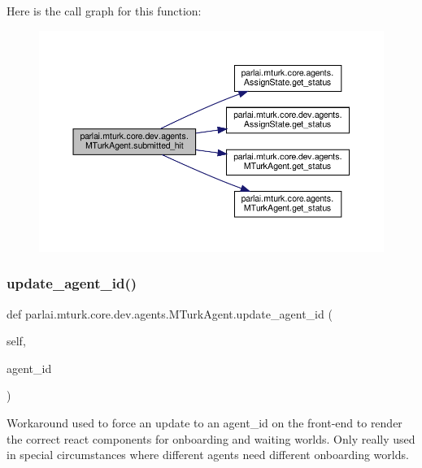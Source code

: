 Here is the call graph for this function\+:
\nopagebreak
\begin{figure}[H]
\begin{center}
\leavevmode
\includegraphics[width=350pt]{classparlai_1_1mturk_1_1core_1_1dev_1_1agents_1_1MTurkAgent_a6662232ebdd301d2547c2433cd0386f3_cgraph}
\end{center}
\end{figure}
\mbox{\label{classparlai_1_1mturk_1_1core_1_1dev_1_1agents_1_1MTurkAgent_a77a8ec97a6c6662dd17cdd9f99d9fce6}} 
\subsubsection{\texorpdfstring{update\+\_\+agent\+\_\+id()}{update\_agent\_id()}}
{\footnotesize\ttfamily def parlai.\+mturk.\+core.\+dev.\+agents.\+M\+Turk\+Agent.\+update\+\_\+agent\+\_\+id (\begin{DoxyParamCaption}\item[{}]{self,  }\item[{}]{agent\+\_\+id }\end{DoxyParamCaption})}

\begin{DoxyVerb}Workaround used to force an update to an agent_id on the front-end
to render the correct react components for onboarding and waiting
worlds. Only really used in special circumstances where different
agents need different onboarding worlds.
\end{DoxyVerb}
 

